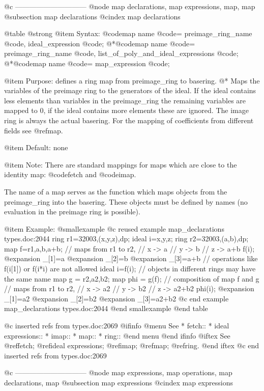 {{{{{{@c ------------------------------
@node map declarations, map expressions, map, map
@subsection map declarations
@cindex map declarations

@table @strong
@item Syntax:
@code{map} name @code{=} preimage_ring_name @code{,} ideal_expression @code{;}
@*@code{map} name @code{=} preimage_ring_name @code{,} list_of_poly_and_ideal_expressions @code{;}
@*@code{map} name @code{=} map_expression @code{;}

@item Purpose:
defines a ring map from preimage_ring to basering.
@* Maps the variables of the preimage ring to the generators of the ideal.
If the ideal contains less elements than variables in the
preimage_ring the remaining variables are mapped to 0, if the ideal contains
more elements these are ignored.
The image ring is always the actual basering.
For the mapping of coefficients from different fields see @ref{map}.

@item Default:
none

@item Note:
There are standard mappings for maps which are close to the identity
map: @code{fetch} and @code{imap}.

The name of a map serves as the function which maps objects from the
preimage_ring into the basering.  These objects must be defined
by names (no evaluation in the preimage ring is possible).

@item Example:
@smallexample
@c reused example map_declarations types.doc:2044 
  ring r1=32003,(x,y,z),dp;
  ideal i=x,y,z;
  ring r2=32003,(a,b),dp;
  map f=r1,a,b,a+b;
  // maps from r1 to r2,
  // x -> a
  // y -> b
  // z -> a+b
  f(i);
@expansion{} _[1]=a
@expansion{} _[2]=b
@expansion{} _[3]=a+b
  // operations like f(i[1]) or f(i*i) are not allowed
  ideal i=f(i);
  // objects in different rings may have the same name
  map g   = r2,a2,b2;
  map phi = g(f);
  // composition of map f and g
  // maps from r1 to r2,
  // x -> a2
  // y -> b2
  // z -> a2+b2
  phi(i);
@expansion{} _[1]=a2
@expansion{} _[2]=b2
@expansion{} _[3]=a2+b2
@c end example map_declarations types.doc:2044
@end smallexample
@end table

@c inserted refs from types.doc:2069
@ifinfo
@menu
See 
* fetch::
* ideal expressions::
* imap::
* map::
* ring::
@end menu
@end ifinfo
@iftex
See 
@ref{fetch};
@ref{ideal expressions};
@ref{imap};
@ref{map};
@ref{ring}.
@end iftex
@c end inserted refs from types.doc:2069

@c ------------------------------
@node map expressions, map operations, map declarations, map
@subsection map expressions
@cindex map expressions

}}}}}}
